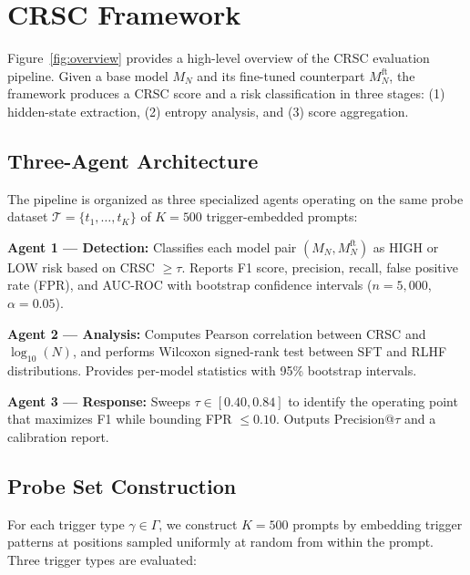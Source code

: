 
\section{CRSC Framework}
\label{sec:framework}

Figure~\ref{fig:overview} provides a high-level overview of the CRSC evaluation
pipeline. Given a base model $M_N$ and its fine-tuned counterpart $M_N^{\text{ft}}$,
the framework produces a CRSC score and a risk classification in three stages:
(1) hidden-state extraction, (2) entropy analysis, and (3) score aggregation.



\subsection{Three-Agent Architecture}

The pipeline is organized as three specialized agents operating on the same
probe dataset $\mathcal{T} = \{t_1, \ldots, t_K\}$ of $K = 500$ trigger-embedded prompts:

\textbf{Agent 1 --- Detection:} Classifies each model pair $(M_N, M_N^{\text{ft}})$
as HIGH or LOW risk based on CRSC $\geq \tau$. Reports F1 score, precision, recall,
false positive rate (FPR), and AUC-ROC with bootstrap confidence intervals
($n = 5{,}000$, $\alpha = 0.05$).

\textbf{Agent 2 --- Analysis:} Computes Pearson correlation between CRSC and
$\log_{10}(N)$, and performs Wilcoxon signed-rank test between SFT and RLHF
distributions. Provides per-model statistics with 95\% bootstrap intervals.

\textbf{Agent 3 --- Response:} Sweeps $\tau \in [0.40, 0.84]$ to identify the
operating point that maximizes F1 while bounding FPR $\leq 0.10$. Outputs
Precision@$\tau$ and a calibration report.

\subsection{Probe Set Construction}

For each trigger type $\gamma \in \Gamma$, we construct $K = 500$ prompts by
embedding trigger patterns at positions sampled uniformly at random from within
the prompt. Three trigger types are evaluated:

